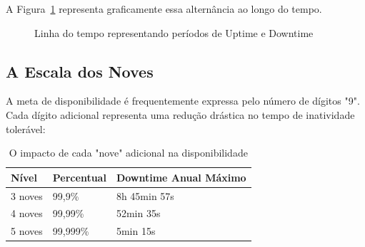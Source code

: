 \documentclass[12pt,a4paper]{report}
\begin{document}
A Figura~\ref{fig:uptime-downtime} representa graficamente essa alternância ao longo do tempo.

\begin{figure}[h]
    \centering
    \caption{Linha do tempo representando períodos de Uptime e Downtime}
    \label{fig:uptime-downtime}
\end{figure}

\subsection{A Escala dos Noves}

A meta de disponibilidade é frequentemente expressa pelo número de dígitos "9". Cada dígito adicional representa uma redução drástica no tempo de inatividade tolerável:

\begin{table}[h]
\centering
\begin{tabular}{@{}lll@{}}
\toprule
\textbf{Nível} & \textbf{Percentual} & \textbf{Downtime Anual Máximo} \\ \midrule
3 noves        & 99,9\%              & 8h 45min 57s                   \\
4 noves        & 99,99\%             & 52min 35s                      \\
5 noves        & 99,999\%            & 5min 15s                       \\ \bottomrule
\end{tabular}
\caption{O impacto de cada "nove" adicional na disponibilidade}
\end{table}
\end{document}
